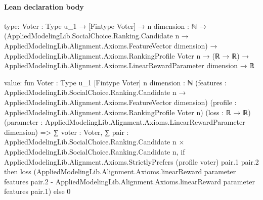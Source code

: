 \documentclass[10pt]{article}
\begin{document}
\paragraph{Lean declaration body}
\begin{ReviewVerbatim}
type:
{Voter : Type u_1} →
  [Fintype Voter] →
    {n dimension : ℕ} →
      (AppliedModelingLib.SocialChoice.Ranking.Candidate n →
          AppliedModelingLib.Alignment.Axioms.FeatureVector dimension) →
        AppliedModelingLib.Alignment.Axioms.RankingProfile Voter n →
          (ℝ → ℝ) → AppliedModelingLib.Alignment.Axioms.LinearRewardParameter dimension → ℝ

value:
fun {Voter : Type u_1} [Fintype Voter] {n dimension : ℕ}
    (features :
      AppliedModelingLib.SocialChoice.Ranking.Candidate n → AppliedModelingLib.Alignment.Axioms.FeatureVector dimension)
    (profile : AppliedModelingLib.Alignment.Axioms.RankingProfile Voter n) (loss : ℝ → ℝ)
    (parameter : AppliedModelingLib.Alignment.Axioms.LinearRewardParameter dimension) =>
  ∑ voter : Voter,
    ∑ pair : AppliedModelingLib.SocialChoice.Ranking.Candidate n × AppliedModelingLib.SocialChoice.Ranking.Candidate n,
      if AppliedModelingLib.Alignment.Axioms.StrictlyPrefers (profile voter) pair.1 pair.2 then
        loss
          (AppliedModelingLib.Alignment.Axioms.linearReward parameter features pair.2 -
            AppliedModelingLib.Alignment.Axioms.linearReward parameter features pair.1)
      else 0
\end{ReviewVerbatim}
\end{document}
